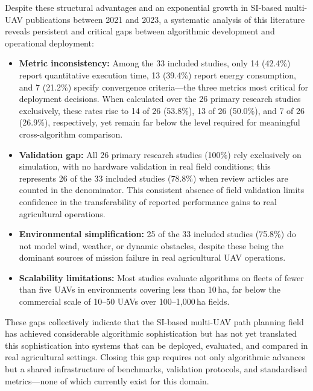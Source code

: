 \documentclass[review,3p,times]{elsarticle}
\begin{document}
Despite these structural advantages and an exponential growth in SI-based multi-UAV publications between 2021 and 2023, a systematic analysis of this literature reveals persistent and critical gaps between algorithmic development and operational deployment:

\begin{itemize}
  \item \textbf{Metric inconsistency:} Among the 33 included studies, only 14 (42.4\%)
  report quantitative execution time, 13 (39.4\%) report energy consumption, and
  7 (21.2\%) specify convergence criteria---the three metrics most critical for
  deployment decisions. When calculated over the 26 primary research studies
  exclusively, these rates rise to 14 of 26 (53.8\%), 13 of 26 (50.0\%), and
  7 of 26 (26.9\%), respectively, yet remain far below the level required for
  meaningful cross-algorithm comparison.

  \item \textbf{Validation gap:} All 26 primary research studies (100\%) rely
  exclusively on simulation, with no hardware validation in real field conditions;
  this represents 26 of the 33 included studies (78.8\%) when review articles are
  counted in the denominator. This consistent absence of field validation limits
  confidence in the transferability of reported performance gains to real agricultural
  operations.

  \item \textbf{Environmental simplification:} 25 of the 33 included studies (75.8\%)
  do not model wind, weather, or dynamic obstacles, despite these being the dominant
  sources of mission failure in real agricultural UAV operations.

  \item \textbf{Scalability limitations:} Most studies evaluate algorithms on fleets
  of fewer than five UAVs in environments covering less than 10\,ha, far below the
  commercial scale of 10--50 UAVs over 100--1,000\,ha fields.
\end{itemize}

These gaps collectively indicate that the SI-based multi-UAV path planning field has achieved considerable algorithmic sophistication but has not yet translated this sophistication into systems that can be deployed, evaluated, and compared in real agricultural settings. Closing this gap requires not only algorithmic advances but a shared infrastructure of benchmarks, validation protocols, and standardised metrics---none of which currently exist for this domain.
\end{document}
